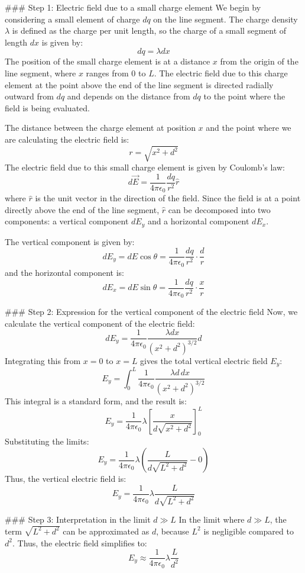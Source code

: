 \documentclass{article}
\begin{document}
### Step 1: Electric field due to a small charge element
We begin by considering a small element of charge \( dq \) on the line segment. The charge density \( \lambda \) is defined as the charge per unit length, so the charge of a small segment of length \( dx \) is given by:
\[
dq = \lambda dx
\]
The position of the small charge element is at a distance \( x \) from the origin of the line segment, where \( x \) ranges from 0 to \( L \). The electric field due to this charge element at the point above the end of the line segment is directed radially outward from \( dq \) and depends on the distance from \( dq \) to the point where the field is being evaluated.

The distance between the charge element at position \( x \) and the point where we are calculating the electric field is:
\[
r = \sqrt{x^2 + d^2}
\]
The electric field due to this small charge element is given by Coulomb's law:
\[
d\vec{E} = \frac{1}{4 \pi \epsilon_0} \frac{dq}{r^2} \hat{r}
\]
where \( \hat{r} \) is the unit vector in the direction of the field. Since the field is at a point directly above the end of the line segment, \( \hat{r} \) can be decomposed into two components: a vertical component \( dE_y \) and a horizontal component \( dE_x \).

The vertical component is given by:
\[
dE_y = dE \cos \theta = \frac{1}{4 \pi \epsilon_0} \frac{dq}{r^2} \cdot \frac{d}{r}
\]
and the horizontal component is:
\[
dE_x = dE \sin \theta = \frac{1}{4 \pi \epsilon_0} \frac{dq}{r^2} \cdot \frac{x}{r}
\]

### Step 2: Expression for the vertical component of the electric field
Now, we calculate the vertical component of the electric field:
\[
dE_y = \frac{1}{4 \pi \epsilon_0} \frac{\lambda dx}{(x^2 + d^2)^{3/2}} d
\]
Integrating this from \( x = 0 \) to \( x = L \) gives the total vertical electric field \( E_y \):
\[
E_y = \int_0^L \frac{1}{4 \pi \epsilon_0} \frac{\lambda d \, dx}{(x^2 + d^2)^{3/2}}
\]
This integral is a standard form, and the result is:
\[
E_y = \frac{1}{4 \pi \epsilon_0} \lambda \left[ \frac{x}{d \sqrt{x^2 + d^2}} \right]_0^L
\]
Substituting the limits:
\[
E_y = \frac{1}{4 \pi \epsilon_0} \lambda \left( \frac{L}{d \sqrt{L^2 + d^2}} - 0 \right)
\]
Thus, the vertical electric field is:
\[
E_y = \frac{1}{4 \pi \epsilon_0} \lambda \frac{L}{d \sqrt{L^2 + d^2}}
\]

### Step 3: Interpretation in the limit \( d \gg L \)
In the limit where \( d \gg L \), the term \( \sqrt{L^2 + d^2} \) can be approximated as \( d \), because \( L^2 \) is negligible compared to \( d^2 \). Thus, the electric field simplifies to:
\[
E_y \approx \frac{1}{4 \pi \epsilon_0} \lambda \frac{L}{d^2}
\]
\end{document}
